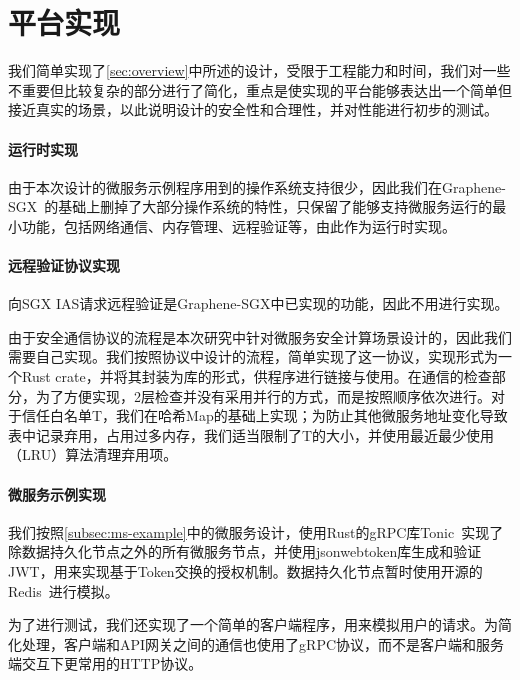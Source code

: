 \section{平台实现}\label{sec:implimentation}

我们简单实现了\cref{sec:overview}中所述的设计，受限于工程能力和时间，我们对一些不重要但比较复杂的部分进行了简化，重点是使实现的平台能够表达出一个简单但接近真实的场景，以此说明设计的安全性和合理性，并对性能进行初步的测试。

\paragraph{运行时实现}

由于本次设计的微服务示例程序用到的操作系统支持很少，因此我们在Graphene-SGX~\cite{tsai2017graphene}的基础上删掉了大部分操作系统的特性，只保留了能够支持微服务运行的最小功能，包括网络通信、内存管理、远程验证等，由此作为运行时实现。

\paragraph{远程验证协议实现}

向SGX IAS请求远程验证是Graphene-SGX中已实现的功能，因此不用进行实现。

由于安全通信协议的流程是本次研究中针对微服务安全计算场景设计的，因此我们需要自己实现。我们按照协议中设计的流程，简单实现了这一协议，实现形式为一个Rust crate，并将其封装为库的形式，供程序进行链接与使用。在通信的检查部分，为了方便实现，2层检查并没有采用并行的方式，而是按照顺序依次进行。对于信任白名单T，我们在哈希Map的基础上实现；为防止其他微服务地址变化导致表中记录弃用，占用过多内存，我们适当限制了T的大小，并使用最近最少使用（LRU）算法清理弃用项。

\paragraph{微服务示例实现}

我们按照\cref{subsec:ms-example}中的微服务设计，使用Rust的gRPC库Tonic~\cite{tonic}实现了除数据持久化节点之外的所有微服务节点，并使用jsonwebtoken库生成和验证JWT，用来实现基于Token交换的授权机制。数据持久化节点暂时使用开源的Redis~\cite{redis}进行模拟。

为了进行测试，我们还实现了一个简单的客户端程序，用来模拟用户的请求。为简化处理，客户端和API网关之间的通信也使用了gRPC协议，而不是客户端和服务端交互下更常用的HTTP协议。
